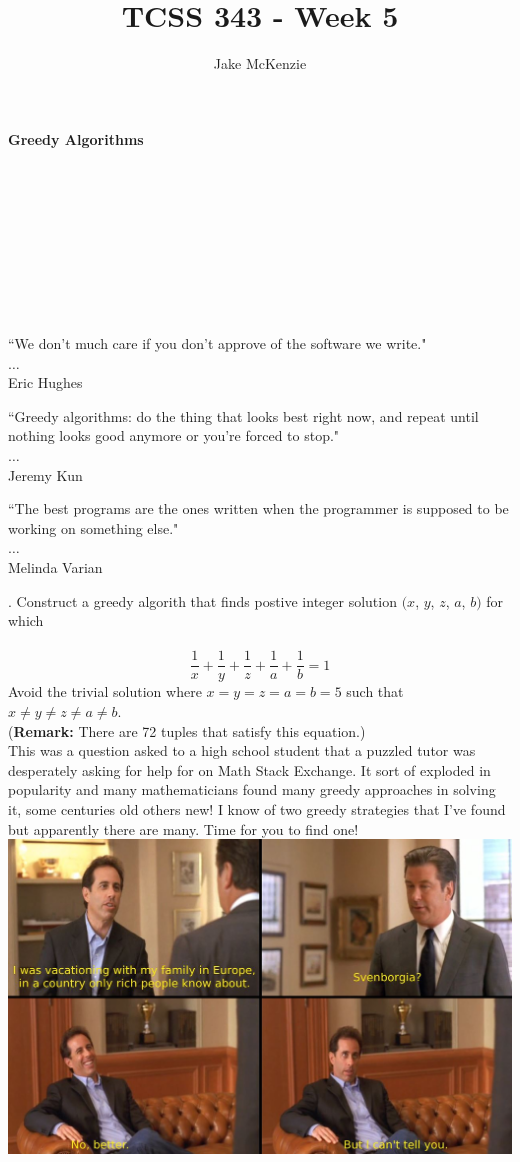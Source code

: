 \documentclass[12pt]{article}
\begin{document}
\title{TCSS 343 - Week 5}
\author{Jake McKenzie}
\maketitle
\noindent\centerline{\textbf{Greedy Algorithms}}\\\\\\\\\\\\\\\\
\begin{center}
    ``We don't much care if you don't approve of the software we write." \\$\dots$\\ Eric Hughes
\end{center}
\begin{center}
    ``Greedy algorithms: do the thing that looks best right now, and repeat until nothing looks good anymore or you're forced to stop." \\$\dots$\\ Jeremy Kun
\end{center}
\begin{center}
    ``The best programs are the ones written when the programmer is supposed to be working on something else." \\$\dots$\\ Melinda Varian
\end{center}
\newpage
{}. Construct a greedy algorith that finds postive integer solution $(x$, $y$, $z$, $a$, $b)$ for which\\\\
$$\frac{1}{x}+\frac{1}{y}+\frac{1}{z}+\frac{1}{a}+\frac{1}{b}=1$$
Avoid the trivial solution where $x=y=z=a=b=5$ such that $x\neq y \neq z \neq a \neq b$.\\
(\textbf{Remark:} There are 72 tuples that satisfy this equation.)\\
This was a question asked to a high school student that a puzzled tutor was desperately asking for help for on Math Stack Exchange.
It sort of exploded in popularity and many mathematicians found many greedy approaches in solving it, some centuries old others new!
I know of two greedy strategies that I've found but apparently there are many. Time for you to find one!
\newpage
\includegraphics[width=\textwidth]{svenborgia.jpg}\\
\end{document}
